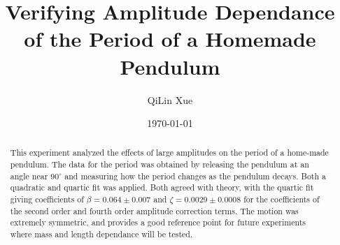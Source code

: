 \documentclass[%
 reprint,
 amsmath,amssymb
 aps,
]{revtex4-2}
\begin{document}

\title{Verifying Amplitude Dependance of the Period of a Homemade Pendulum}%

\author{QiLin Xue}

\date{\today}%

\begin{abstract}
This experiment analyzed the effects of large amplitudes on the period of a home-made pendulum. The data for the period was obtained by releasing the pendulum at an angle near $90^\circ$ and measuring how the period changes as the pendulum decays. Both a quadratic and quartic fit was applied. Both agreed with theory, with the quartic fit giving coefficients of $\beta=0.064\pm 0.007$ and $\zeta=0.0029 \pm 0.0008$ for the coefficients of the second order and fourth order amplitude correction terms. The motion was extremely symmetric, and provides a good reference point for future experiments where mass and length dependance will be tested.
\end{abstract}

\maketitle

\end{document}
